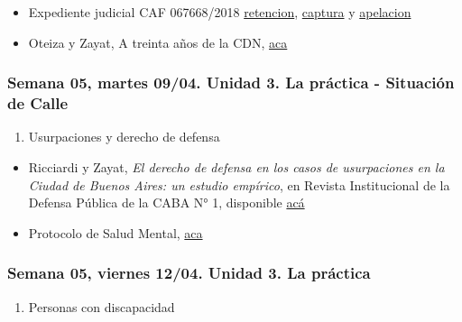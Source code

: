 \documentclass[
]{article}
\providecommand{\tightlist}{%
  \setlength{\itemsep}{0pt}\setlength{\parskip}{0pt}}
\begin{document}
\begin{itemize}
\tightlist
\item
  Expediente judicial CAF 067668/2018
  \href{https://drive.google.com/file/d/1MszNbvuQgl56ukSCbql4ggAAKyiia5Bs/view?usp=sharing}{retencion},
  \href{https://drive.google.com/file/d/11RSJ0lXuMKwhQy-gVHfODbc-AH1fBE0j/view?usp=sharing}{captura}
  y
  \href{https://drive.google.com/file/d/1xsXyT2y3F7sGL8yhK8kG6GTfhkYi7nVw/view?usp=sharing}{apelacion}
\item
  Oteiza y Zayat, A treinta años de la CDN,
  \href{https://drive.google.com/file/d/1rZbIfh3834THG1K07moFq1Cgp_zmYtsk/view?usp=sharing}{aca}
\end{itemize}

\hypertarget{semana-05-martes-0904.-unidad-3.-la-pruxe1ctica---situaciuxf3n-de-calle}{%
\subsubsection{Semana 05, martes 09/04. Unidad 3. La práctica -
Situación de
Calle}\label{semana-05-martes-0904.-unidad-3.-la-pruxe1ctica---situaciuxf3n-de-calle}}

\begin{enumerate}
\def\labelenumi{\alph{enumi}.}
\setcounter{enumi}{1}
\tightlist
\item
  Usurpaciones y derecho de defensa
\end{enumerate}

\begin{itemize}
\item
  Ricciardi y Zayat, \emph{El derecho de defensa en los casos de
  usurpaciones en la Ciudad de Buenos Aires: un estudio empírico}, en
  Revista Institucional de la Defensa Pública de la CABA N° 1,
  disponible
  \href{https://drive.google.com/file/d/1KeqFSqkZ2aBrHXkRcIaZCVu6AMSaX7zH/view?usp=sharing}{acá}
\item
  Protocolo de Salud Mental,
  \href{https://drive.google.com/file/d/1_1DCvbeTGT8gLp9pAMsCejJeJPs-2mj2/view?usp=sharing}{aca}
\end{itemize}

\hypertarget{semana-05-viernes-1204.-unidad-3.-la-pruxe1ctica}{%
\subsubsection{Semana 05, viernes 12/04. Unidad 3. La
práctica}\label{semana-05-viernes-1204.-unidad-3.-la-pruxe1ctica}}

\begin{enumerate}
\def\labelenumi{\alph{enumi}.}
\setcounter{enumi}{1}
\tightlist
\item
  Personas con discapacidad
\end{enumerate}
\end{document}

